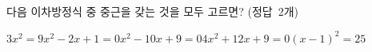 다음 이차방정식 중 중근을 갖는 것을 모두 고르면? \mbox{(정답 2개)}
\begin{choicesii}{$3x^2=9$}{$x^2-2x+1=0$}{$x^2-10x+9=0$}{$4x^2+12x+9=0$}{$(x-1)^2=25$}\end{choicesii}
